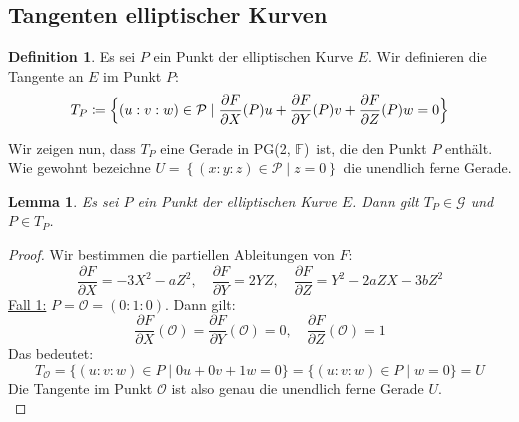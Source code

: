 \documentclass[hidelinks]{article}
\theoremstyle{plain}
\newtheorem{lem}[thm]{Lemma}
\theoremstyle{definition}
\newtheorem{defn}[thm]{Definition}
\theoremstyle{rem}
\newcommand{\pgtwo}{PG(2, $\mathbb{F}$)\ }
\newcommand{\patinf}{\mathcal{O}}
\begin{document}
\begin{sloppypar}
\subsection{Tangenten elliptischer Kurven}
\begin{defn}
    Es sei $P$ ein Punkt der elliptischen Kurve $E$. Wir definieren die Tangente an $E$ im Punkt $P$:
    \begin{equation*}
        T_P\coloneqq\Bigl\{(u:v:w)\in\mathcal{P}\mid\frac{\partial F}{\partial X}(P)u+\frac{\partial F}{\partial Y}(P)v+\frac{\partial F}{\partial Z}(P)w=0\Bigr\}
    \end{equation*}
\end{defn}
Wir zeigen nun, dass $T_P$ eine Gerade in \pgtwo ist, die den Punkt $P$ enthält. Wie gewohnt bezeichne $U=\left\{ (x:y:z) \in \mathcal{P} \mid z = 0 \right\}$ die unendlich ferne Gerade.

\begin{lem}\label{proj-tang}
    Es sei $P$ ein Punkt der elliptischen Kurve $E$. Dann gilt $T_P\in\mathcal{G}$ und $P\in T_P$.
\end{lem}
\begin{proof}
    Wir bestimmen die partiellen Ableitungen von $F$:
    \begin{equation*}
        \frac{\partial F}{\partial X}=-3X^2-aZ^2,\quad \frac{\partial F}{\partial Y}=2YZ,\quad \frac{\partial F}{\partial Z}=Y^2-2aZX-3bZ^2
    \end{equation*}
    \underline{Fall 1:} $P=\patinf=(0:1:0)$. Dann gilt:
    \begin{equation*}
        \frac{\partial F}{\partial X}(\patinf)=\frac{\partial F}{\partial Y}(\patinf)=0,\quad \frac{\partial F}{\partial Z}(\patinf)=1
    \end{equation*}
    Das bedeutet:
    \begin{equation*}
        T_{\patinf}=\{(u:v:w)\in P\mid 0u+0v+1w=0\}=\{(u:v:w)\in P\mid w=0\}=U
    \end{equation*}
    Die Tangente im Punkt $\patinf$ ist also genau die unendlich ferne Gerade $U$.\\


\end{proof}
\end{sloppypar}
\end{document}
